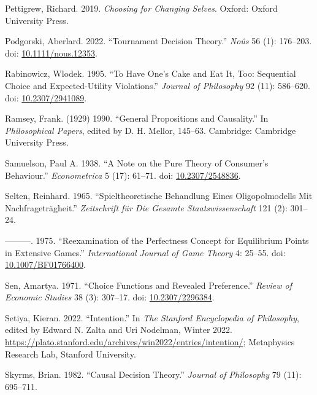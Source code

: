 \documentclass[
  10pt,
  letterpaper,
  DIV=11,
  numbers=noendperiod,
  twoside]{scrartcl}
\newlength{\cslhangindent}
\newenvironment{CSLReferences}[2] %
 {\begin{list}{}{%
  \setlength{\itemindent}{0pt}
  \setlength{\leftmargin}{0pt}
  \setlength{\parsep}{0pt}
  \ifodd #1
   \setlength{\leftmargin}{\cslhangindent}
   \setlength{\itemindent}{-1\cslhangindent}
  \fi
  \setlength{\itemsep}{#2\baselineskip}}}
 {\end{list}}
\begin{document}
\begin{CSLReferences}{1}{0}
Pettigrew, Richard. 2019. \emph{Choosing for Changing Selves}. Oxford:
{O}xford {U}niversity {P}ress.

Podgorski, Aberlard. 2022. {``Tournament Decision Theory.''}
\emph{No{û}s} 56 (1): 176--203. doi:
\href{https://doi.org/10.1111/nous.12353}{10.1111/nous.12353}.

Rabinowicz, Wlodek. 1995. {``To Have One's Cake and Eat It, Too:
Sequential Choice and Expected-Utility Violations.''} \emph{Journal of
Philosophy} 92 (11): 586--620. doi:
\href{https://doi.org/10.2307/2941089}{10.2307/2941089}.

Ramsey, Frank. (1929) 1990. {``General Propositions and Causality.''} In
\emph{Philosophical Papers}, edited by D. H. Mellor, 145--63. Cambridge:
Cambridge University Press.

Samuelson, Paul A. 1938. {``A Note on the Pure Theory of Consumer's
Behaviour.''} \emph{Econometrica} 5 (17): 61--71. doi:
\href{https://doi.org/10.2307/2548836}{10.2307/2548836}.

Selten, Reinhard. 1965. {``Spieltheoretische Behandlung Eines
Oligopolmodells Mit Nachfragetr{ä}gheit.''} \emph{Zeitschrift f{ü}r Die
Gesamte Staatswissenschaft} 121 (2): 301--24.

---------. 1975. {``Reexamination of the Perfectness Concept for
Equilibrium Points in Extensive Games.''} \emph{International Journal of
Game Theory} 4: 25--55. doi:
\href{https://doi.org/10.1007/BF01766400}{10.1007/BF01766400}.

Sen, Amartya. 1971. {``Choice Functions and Revealed Preference.''}
\emph{Review of Economic Studies} 38 (3): 307--17. doi:
\href{https://doi.org/10.2307/2296384}{10.2307/2296384}.

Setiya, Kieran. 2022. {``{Intention}.''} In \emph{The {Stanford}
Encyclopedia of Philosophy}, edited by Edward N. Zalta and Uri Nodelman,
{W}inter 2022.
\url{https://plato.stanford.edu/archives/win2022/entries/intention/};
Metaphysics Research Lab, Stanford University.

Skyrms, Brian. 1982. {``Causal Decision Theory.''} \emph{Journal of
Philosophy} 79 (11): 695--711.


\end{CSLReferences}
\end{document}
